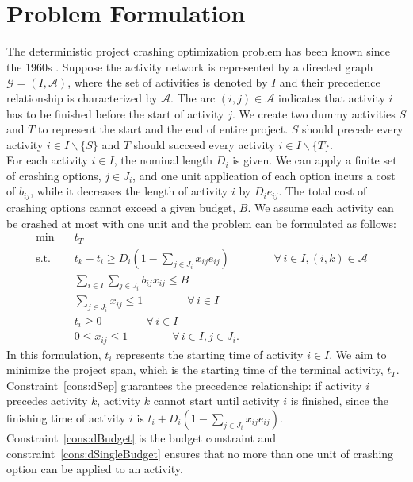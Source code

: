 \documentclass[11pt]{article}
\begin{document}
\section{Problem Formulation} \label{sec:formulation}
	The deterministic project crashing optimization problem has been known since the 1960s \cite{fulkerson1961network, kelley1961criticalpath}. Suppose the activity network is represented by a directed graph \(\mathcal{G} = (I,\mathcal{A})\), where the set of activities is denoted by \(I\) and their precedence relationship is characterized by \(\mathcal{A}\). The arc \((i,j) \in \mathcal{A}\) indicates that activity \(i\) has to be finished before the start of activity \(j\). We create two dummy activities \(S\) and \(T\) to represent the start and the end of entire project. \(S\) should precede every activity \(i \in I \backslash \{S\}\) and \(T\) should succeed every activity \(i \in I \backslash \{T\} \). \\
	\newline
	For each activity \(i \in I\), the nominal length \(D_i\) is given. We can apply a finite set of crashing options, \(j \in J_i\), and one unit application of each option incurs a cost of \(b_{ij}\), while it decreases the length of activity \(i\) by \(D_ie_{ij}\). The total cost of crashing options cannot exceed a given budget, \(B\). We assume each activity can be crashed at most with one unit and the problem can be formulated as follows:
	\begin{subequations} \label{prob:static}
		\begin{align}
		\min \quad & t_T &\\
		\text{s.t.} \quad &  t_k - t_i \geq D_{i}(1 - \sum_{j \in J_i} x_{ij} e_{ij}) \qquad \qquad \forall \,i \in I, (i,k) \in \mathcal{A} \label{cons:dSep}\\
		& \sum_{i \in I} \sum_{j \in J_i} b_{ij}x_{ij} \leq B  \label{cons:dBudget}\\
		& \sum_{j \in J_i} x_{ij} \leq 1  \qquad \qquad \forall \,i \in I \label{cons:dSingleBudget}\\
		& t_i \geq 0  \qquad \qquad \forall \,i \in I\\
		& 0 \leq x_{ij} \leq 1  \qquad \qquad \forall \,i \in I, j \in J_i.
		\end{align}
	\end{subequations}
	In this formulation, \(t_i\) represents the starting time of activity \(i \in I\). We aim to minimize the project span, which is the starting time of the terminal activity, \(t_T\). Constraint~\eqref{cons:dSep} guarantees the precedence relationship: if activity \(i\) precedes activity \(k\), activity \(k\) cannot start until activity \(i\) is finished, since the finishing time of activity \(i\) is \(t_i + D_i (1- \sum_{j \in J_i} x_{ij}e_{ij})\). Constraint~\eqref{cons:dBudget} is the budget constraint and constraint~\eqref{cons:dSingleBudget} ensures that no more than one unit of crashing option can be applied to an activity. \\
\end{document}
